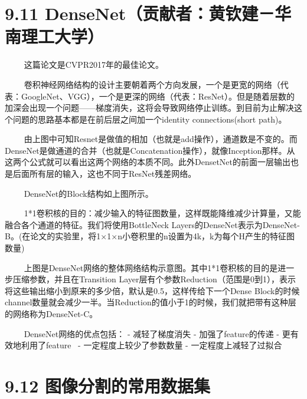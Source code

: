\section{9.11
DenseNet（贡献者：黄钦建－华南理工大学）}\label{densenetux8d21ux732eux8005ux9ec4ux94a6ux5efaux534eux5357ux7406ux5de5ux5927ux5b66}

   这篇论文是CVPR2017年的最佳论文。

  
卷积神经网络结构的设计主要朝着两个方向发展，一个是更宽的网络（代表：GoogleNet、VGG），一个是更深的网络（代表：ResNet）。但是随着层数的加深会出现一个问题------梯度消失，这将会导致网络停止训练。到目前为止解决这个问题的思路基本都是在前后层之间加一个identity
connections(short path)。

\begin{figure}
\centering
\end{figure}

  
由上图中可知Resnet是做值的相加（也就是add操作），通道数是不变的。而DenseNet是做通道的合并（也就是Concatenation操作），就像Inception那样。从这两个公式就可以看出这两个网络的本质不同。此外DensetNet的前面一层输出也是后面所有层的输入，这也不同于ResNet残差网络。

\begin{figure}
\centering
\end{figure}

   DenseNet的Block结构如上图所示。

  
1*1卷积核的目的：减少输入的特征图数量，这样既能降维减少计算量，又能融合各个通道的特征。我们将使用BottleNeck
Layers的DenseNet表示为DenseNet-B。(在论文的实验里，将1×1×n小卷积里的n设置为4k，k为每个H产生的特征图数量)

\begin{figure}
\centering
\end{figure}

  
上图是DenseNet网络的整体网络结构示意图。其中1*1卷积核的目的是进一步压缩参数，并且在Transition
Layer层有个参数Reduction（范围是0到1），表示将这些输出缩小到原来的多少倍，默认是0.5，这样传给下一个Dense
Block的时候channel数量就会减少一半。当Reduction的值小于1的时候，我们就把带有这种层的网络称为DenseNet-C。

   DenseNet网络的优点包括： - 减轻了梯度消失 - 加强了feature的传递 -
更有效地利用了feature~ - 一定程度上较少了参数数量 -
一定程度上减轻了过拟合

\section{9.12
图像分割的常用数据集}\label{ux56feux50cfux5206ux5272ux7684ux5e38ux7528ux6570ux636eux96c6}

